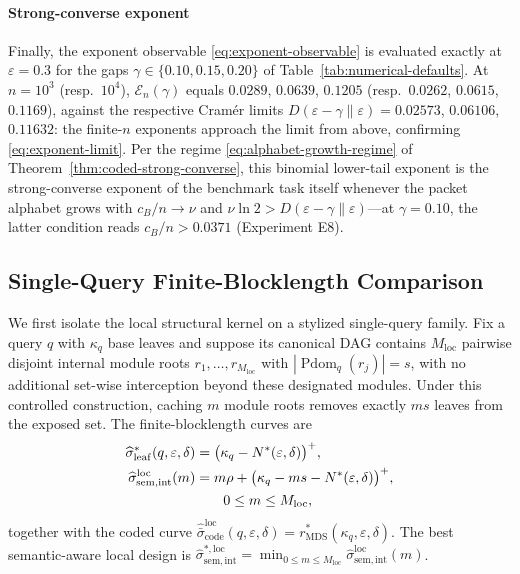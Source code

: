 \documentclass[journal]{IEEEtran}
\numberwithin{equation}{section}
\begin{document}
\paragraph*{Strong-converse exponent}
Finally, the exponent observable \eqref{eq:exponent-observable} is evaluated
exactly at \(\varepsilon=0.3\) for the gaps
\(\gamma\in\{0.10,0.15,0.20\}\) of Table~\ref{tab:numerical-defaults}.  At
\(n=10^{3}\) (resp.\ \(10^{4}\)), \(\mathcal E_n(\gamma)\) equals
\(0.0289\), \(0.0639\), \(0.1205\) (resp.\ \(0.0262\), \(0.0615\),
\(0.1169\)), against the respective Cram\'er limits
\(D(\varepsilon-\gamma\|\varepsilon)=0.02573\), \(0.06106\), \(0.11632\):
the finite-\(n\) exponents approach the limit from above, confirming
\eqref{eq:exponent-limit}.  Per the regime
\eqref{eq:alphabet-growth-regime} of
Theorem~\ref{thm:coded-strong-converse}, this binomial lower-tail exponent
is the strong-converse exponent of the benchmark task itself whenever the
packet alphabet grows with \(c_B/n\to\nu\) and
\(\nu\ln 2>D(\varepsilon-\gamma\|\varepsilon)\)---at \(\gamma=0.10\), the
latter condition reads \(c_B/n>0.0371\) (Experiment E8).

\subsection{Single-Query Finite-Blocklength Comparison}
\label{subsec:numerical-single-query}

We first isolate the local structural kernel on a stylized single-query
family.  Fix a query \(q\) with \(\kappa_q\) base leaves and suppose its
canonical DAG contains \(M_{\mathrm{loc}}\) pairwise disjoint internal module
roots \(r_1,\ldots,r_{M_{\mathrm{loc}}}\) with
\(|\operatorname{Pdom}_q(r_j)|=s\), with no additional set-wise interception
beyond these designated modules.  Under this controlled construction, caching
\(m\) module roots removes exactly \(ms\) leaves from the exposed set.  The
finite-blocklength curves are
\begin{align}
  \widehat{\sigma}_{\mathrm{leaf}}^*
  (q,\varepsilon,\delta)
  &=
  \bigl(\kappa_q-N^*(\varepsilon,\delta)\bigr)^+,
\label{eq:numerical-local-leaf}\\
  \widehat{\sigma}_{\mathrm{sem,int}}^{\mathrm{loc}}(m)
  &=
  m\rho
  +
  \bigl(
    \kappa_q-ms-N^*(\varepsilon,\delta)
  \bigr)^{+},
\label{eq:numerical-local-sem}\\
  &\qquad
  0\le m\le M_{\mathrm{loc}},
\notag
\end{align}
together with the coded curve
\(\widehat{\bar{\sigma}}_{\mathrm{code}}^{\mathrm{loc}}
(q,\varepsilon,\delta)=r_{\mathrm{MDS}}^*(\kappa_q,\varepsilon,\delta)\).
The best semantic-aware local design is
\(\widehat{\sigma}_{\mathrm{sem,int}}^{*,\mathrm{loc}}
=\min_{0\le m\le M_{\mathrm{loc}}}
\widehat{\sigma}_{\mathrm{sem,int}}^{\mathrm{loc}}(m)\).
\end{document}
